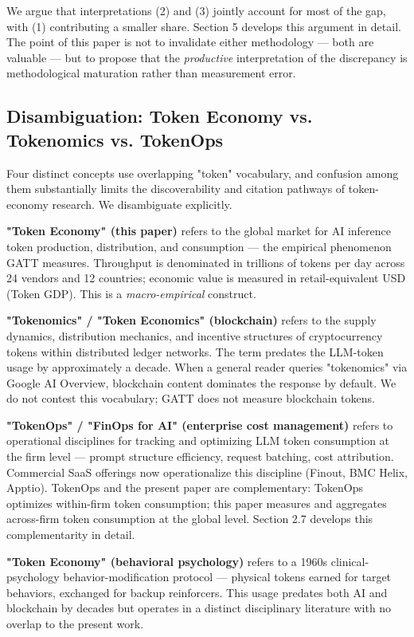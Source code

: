 \documentclass[11pt,a4paper]{article}
\begin{document}
We argue that interpretations (2) and (3) jointly account for most of the gap, with (1) contributing a smaller share. Section 5 develops this argument in detail. The point of this paper is not to invalidate either methodology --- both are valuable --- but to propose that the \emph{productive} interpretation of the discrepancy is methodological maturation rather than measurement error.

\subsection{Disambiguation: Token Economy vs. Tokenomics vs. TokenOps}

Four distinct concepts use overlapping "token" vocabulary, and confusion among them substantially limits the discoverability and citation pathways of token-economy research. We disambiguate explicitly.

\textbf{"Token Economy" (this paper)} refers to the global market for AI inference token production, distribution, and consumption --- the empirical phenomenon GATT measures. Throughput is denominated in trillions of tokens per day across 24 vendors and 12 countries; economic value is measured in retail-equivalent USD (Token GDP). This is a \emph{macro-empirical} construct.

\textbf{"Tokenomics" / "Token Economics" (blockchain)} refers to the supply dynamics, distribution mechanics, and incentive structures of cryptocurrency tokens within distributed ledger networks. The term predates the LLM-token usage by approximately a decade. When a general reader queries "tokenomics" via Google AI Overview, blockchain content dominates the response by default. We do not contest this vocabulary; GATT does not measure blockchain tokens.

\textbf{"TokenOps" / "FinOps for AI" (enterprise cost management)} \cite{finout2024tokenops, healthark2025tokenecon, inventivehq2025promptopt} refers to operational disciplines for tracking and optimizing LLM token consumption at the firm level --- prompt structure efficiency, request batching, cost attribution. Commercial SaaS offerings now operationalize this discipline (Finout, BMC Helix, Apptio). TokenOps and the present paper are complementary: TokenOps optimizes within-firm token consumption; this paper measures and aggregates across-firm token consumption at the global level. Section 2.7 develops this complementarity in detail.

\textbf{"Token Economy" (behavioral psychology)} refers to a 1960s clinical-psychology behavior-modification protocol --- physical tokens earned for target behaviors, exchanged for backup reinforcers. This usage predates both AI and blockchain by decades but operates in a distinct disciplinary literature with no overlap to the present work.
\end{document}
